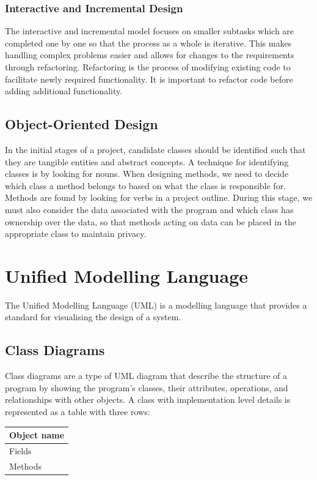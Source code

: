 \documentclass{article}
\begin{document}
\subsubsection{Interactive and Incremental Design}
The interactive and incremental model focuses on smaller subtasks which
are completed one by one so that the process as a whole is iterative.
This makes handling complex problems easier and allows for changes to
the requirements through refactoring. Refactoring is the process of
modifying existing code to facilitate newly required functionality. It
is important to refactor code before adding additional functionality.
\subsection{Object-Oriented Design}
In the initial stages of a project, candidate classes should be
identified such that they are tangible entities and abstract concepts.
A technique for identifying classes is by looking for nouns. When
designing methods, we need to decide which class a method belongs to
based on what the class is responsible for. Methods are found by
looking for verbs in a project outline. During this stage, we must also
consider the data associated with the program and which class has
ownership over the data, so that methods acting on data can be placed
in the appropriate class to maintain privacy.
\section{Unified Modelling Language}
The Unified Modelling Language (UML) is a modelling language that
provides a standard for visualising the design of a system.
\subsection{Class Diagrams}
Class diagrams are a type of UML diagram that describe the structure of
a program by showing the program's classes, their attributes,
operations, and relationships with other objects. A class with
implementation level details is represented as a table with three rows:
\begin{table}[H]
    \centering
    \begin{tabular}{|l|}
        \hline
        \textbf{Object name} \\
        \hline
        Fields               \\
        \hline
        Methods              \\
        \hline
    \end{tabular}
\end{table}
\end{document}
